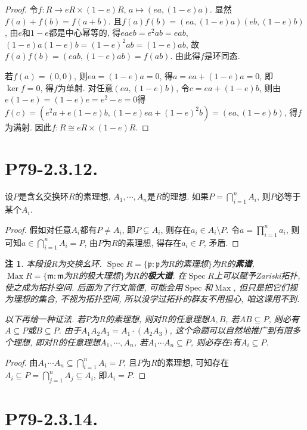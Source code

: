 \documentclass[12pt, a4paper, fontset=windows]{ctexart}
\newcommand{\Max}{\operatorname{Max}}
\newcommand{\Spec}{\operatorname{Spec}}
\newcommand{\isom}{\cong} %
\newtheorem*{remark}{注}
\begin{document}
\begin{proof}
令$f:R\to eR\times(1-e)R$, $a\mapsto(ea,(1-e)a)$. 
显然$f(a)+f(b)=f(a+b)$. 且$f(a)f(b)=(ea,(1-e)a)(eb,(1-e)b)$, 
由$e$和$1-e$都是中心幂等的, 得$eaeb=e^2ab=eab$, 
$(1-e)a(1-e)b=(1-e)^2ab=(1-e)ab$, 故$f(a)f(b)=(eab,(1-e)ab)=f(ab)$. 
由此得$f$是环同态. 

若$f(a)=(0,0)$, 则$ea=(1-e)a=0$, 得$a=ea+(1-e)a=0$, 即$\ker f=0$, 
得$f$为单射. 对任意$(ea,(1-e)b)$, 令$c=ea+(1-e)b$, 则由$e(1-e)=(1-e)e=e^2-e=0$得
$f(c)=(e^2a+e(1-e)b,(1-e)ea+(1-e)^2b)=(ea,(1-e)b)$, 得$f$为满射. 
因此$f:R\isom eR\times(1-e)R$. 
\end{proof}

\section*{P79-2.3.12.}

设$P$是含幺交换环$R$的素理想, $A_1,\cdots,A_n$是$R$的理想. 
如果$P=\bigcap^n_{i=1}A_i$, 则$P$必等于某个$A_i$. 

\begin{proof}
假如对任意$A_i$都有$P\ne A_i$, 即$P\subsetneq A_i$, 
则存在$a_i\in A_i\setminus P$. 令$a=\prod^n_{i=1}a_i$, 
则可知$a\in\bigcap^n_{i=1}A_i=P$, 由$P$为$R$的素理想, 
得存在$a_i\in P$, 矛盾. 
\end{proof}

\begin{remark}
本段设$R$为交换幺环. 
$\Spec R=\{\mathfrak{p}:\mathfrak{p}$为$R$的素理想$\}$为$R$的{\bf 素谱}, 
$\Max R=\{\mathfrak{m}:\mathfrak{m}$为$R$的极大理想$\}$为$R$的{\bf 极大谱}. 
在$\Spec R$上可以赋予Zariski拓扑, 使之成为拓扑空间. 
后面为了行文简便, 可能会用$\Spec$和$\Max$, 但只是把它们视为理想的集合, 
不视为拓扑空间, 所以没学过拓扑的群友不用担心, 咱这课用不到. 

以下再给一种证法. 若$P$为$R$的素理想, 则对$R$的任意理想$A,B$, 
若$AB\subseteq P$, 则必有$A\subseteq P$或$B\subseteq P$. 
由于$A_1A_2A_3=A_1\cdot(A_2A_3)$, 
这个命题可以自然地推广到有限多个理想, 即对$R$的任意理想$A_1,\cdots,A_n$, 
若$A_1\cdots A_n\subseteq P$, 则必存在$i$有$A_i\subseteq P$. 
\end{remark}

\begin{proof}
由$A_1\cdots A_n\subseteq\bigcap^n_{i=1}A_i=P$, 且$P$为$R$的素理想, 
可知存在$A_i\subseteq P=\bigcap^n_{j=1}A_j\subseteq A_i$, 即$A_i=P$. 
\end{proof}

\section*{P79-2.3.14.}
\end{document}
